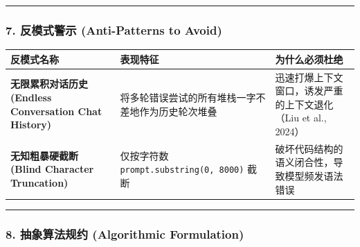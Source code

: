 \begin{center}\rule{0.5\linewidth}{0.5pt}\end{center}

\subsubsection{7. 反模式警示 (Anti-Patterns to
Avoid)}\label{ux53cdux6a21ux5f0fux8b66ux793a-anti-patterns-to-avoid-20}

{\def\LTcaptype{} %
\begin{longtable}[]{@{}
  >{\raggedright\arraybackslash}p{}
  >{\raggedright\arraybackslash}p{}
  >{\raggedright\arraybackslash}p{}@{}}
\toprule\noalign{}
\begin{minipage}[b]{\linewidth}\raggedright
反模式名称
\end{minipage} & \begin{minipage}[b]{\linewidth}\raggedright
表现特征
\end{minipage} & \begin{minipage}[b]{\linewidth}\raggedright
为什么必须杜绝
\end{minipage} \\
\midrule\noalign{}
\endhead
\bottomrule\noalign{}
\endlastfoot
\textbf{无限累积对话历史 (Endless Conversation Chat History)} &
将多轮错误尝试的所有堆栈一字不差地作为历史轮次堆叠 &
迅速打爆上下文窗口，诱发严重的上下文退化（Liu et al., 2024） \\
\textbf{无知粗暴硬截断 (Blind Character Truncation)} & 仅按字符数
\texttt{prompt.substring(0,\ 8000)} 截断 &
破坏代码结构的语义闭合性，导致模型频发语法错误 \\
\end{longtable}
}

\begin{center}\rule{0.5\linewidth}{0.5pt}\end{center}

\subsubsection{8. 抽象算法规约 (Algorithmic
Formulation)}\label{ux62bdux8c61ux7b97ux6cd5ux89c4ux7ea6-algorithmic-formulation-19}

